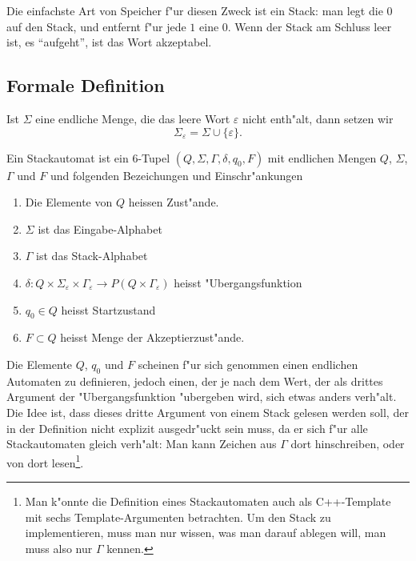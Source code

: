 Die einfachste Art von Speicher f"ur diesen Zweck ist ein Stack:
man legt die $0$ auf den Stack, und entfernt f"ur jede $1$ eine 
$0$. Wenn der Stack am Schluss leer ist, es ``aufgeht'', ist das
Wort akzeptabel.

\subsection{Formale Definition}
\begin{definition}
Ist $\Sigma$ eine endliche Menge, die das leere Wort $\varepsilon$
nicht enth"alt, dann setzen wir 
\[
\Sigma_\varepsilon = \Sigma\cup \{\varepsilon\}.
\]
\end{definition}

\begin{definition}
Ein Stackautomat ist ein $6$-Tupel $(Q,\Sigma,\Gamma,\delta,q_0,F)$
mit endlichen Mengen $Q$, $\Sigma$, $\Gamma$ und $F$ und folgenden
Bezeichungen und Einschr"ankungen
\begin{enumerate}
\item Die Elemente von $Q$ heissen Zust"ande.
\item $\Sigma$ ist das Eingabe-Alphabet
\item $\Gamma$ ist das Stack-Alphabet
\item $\delta\colon Q\times \Sigma_\varepsilon\times\Gamma_\varepsilon
\to P(Q\times\Gamma_\varepsilon)$ heisst "Ubergangsfunktion
\item $q_0\in Q$ heisst Startzustand
\item $F\subset Q$ heisst Menge der Akzeptierzust"ande.
\end{enumerate}
\end{definition}
Die Elemente $Q$, $q_0$ und $F$ scheinen f"ur sich genommen
einen endlichen Automaten zu definieren, jedoch einen, der je nach
dem Wert, der als drittes Argument der "Ubergangsfunktion
"ubergeben wird, sich etwas anders verh"alt. Die Idee ist, dass
dieses dritte Argument von einem Stack gelesen werden soll, der in
der Definition nicht explizit ausgedr"uckt sein muss, da er
sich f"ur alle Stackautomaten gleich verh"alt: Man kann Zeichen
aus $\Gamma$ dort hinschreiben, oder von dort lesen\footnote{Man k"onnte
die Definition eines Stackautomaten auch als C++-Template mit
sechs Template-Argumenten betrachten. Um den Stack zu
implementieren, muss man nur wissen, was man darauf ablegen will,
man muss also nur $\Gamma$ kennen.}.

